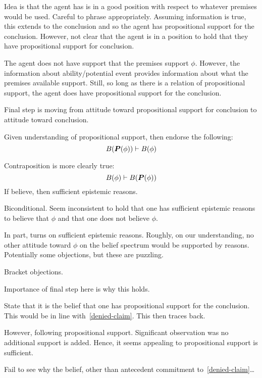 \begin{note}
  Idea is that the agent has is in a good position with respect to whatever premises would be used.
  Careful to phrase appropriately.
  Assuming information is true, this extends to the conclusion and so the agent has propositional support for the conclusion.
  However, not clear that the agent is in a position to hold that they have propositional support for conclusion.
\end{note}

{
  \color{red}
  \begin{note}
    The agent does not have support that the premises support \(\phi\).
    However, the information about ability/potential event provides information about what the premises available support.
    Still, so long as there is a relation of propositional support, the agent does have propositional support for the conclusion.
  \end{note}
}

\begin{note}
  Final step is moving from attitude toward propositional support for conclusion to attitude toward conclusion.

  Given understanding of propositional support, then endorse the following:
  \[B(\bm{P}(\phi)) \vdash B(\phi)\]

  Contraposition is more clearly true:
  \[B(\phi) \vdash B(\bm{P}(\phi))\]
  If believe, then sufficient epistemic reasons.

  Biconditional.
  Seem inconsistent to hold that one has sufficient epistemic reasons to believe that \(\phi\) and that one does not believe \(\phi\).

  In part, turns on sufficient epistemic reasons.
  Roughly, on our understanding, no other attitude toward \(\phi\) on the belief spectrum would be supported by reasons.
  Potentially some objections, but these are puzzling.

  Bracket objections.

  Importance of final step here is why this holds.

  State that it is the belief that one has propositional support for the conclusion.
  This would be in line with~\ref{denied-claim}.
  This then traces back.

  However, following propositional support.
  Significant observation was no additional support is added.
  Hence, it seems appealing to propositional support is sufficient.

  Fail to see why the belief, other than antecedent commitment to~\ref{denied-claim}\dots
\end{note}

